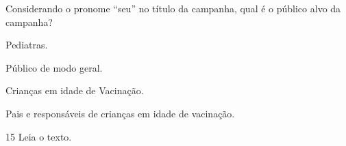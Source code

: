 \noindent Considerando o pronome ``seu'' no título da campanha, qual é o público
alvo da campanha?

\begin{escolha}
\item Pediatras.
\item Público de modo geral.
\item Crianças em idade de Vacinação.
\item Pais e responsáveis de crianças em idade de vacinação.
\end{escolha}



\num{15} Leia o texto.

